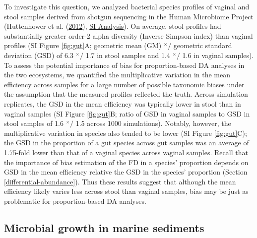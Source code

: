 \documentclass[
]{article}
\newcommand{\md}{^{\times}\!/}
\begin{document}
To investigate this question, we analyzed bacterial species profiles of vaginal and stool samples derived from shotgun sequencing in the Human Microbiome Project
(Huttenhower et al. (\protect\hyperlink{ref-huttenhower2012stru}{2012}), \href{https://mikemc.github.io/differential-abundance-theory/notebook/posts/2022-01-30-hmp-stool-vagina-comparison/}{SI Analysis}).
On average, stool profiles had substantially greater order-2 alpha diversity (Inverse Simpson index) than vaginal profiles (SI Figure \ref{fig:gut}A; geometric mean (GM) \(\md\) geometric standard deviation (GSD) of 6.3 \(\md\) 1.7 in stool samples and 1.4 \(\md\) 1.6 in vaginal samples).
To assess the potential importance of bias for proportion-based DA analyses in the two ecosystems, we quantified the multiplicative variation in the mean efficiency across samples for a large number of possible taxonomic biases under the assumption that the measured profiles reflected the truth.
Across simulation replicates, the GSD in the mean efficiency was typically lower in stool than in vaginal samples (SI Figure \ref{fig:gut}B; ratio of GSD in vaginal samples to GSD in stool samples of 1.6 \(\md\) 1.5 across 1000 simulations).
Notably, however, the multiplicative variation in species also tended to be lower (SI Figure \ref{fig:gut}C); the GSD in the proportion of a gut species across gut samples was an average of 1.75-fold lower than that of a vaginal species across vaginal samples.
Recall that the importance of bias estimation of the FD in a species' proportion depends on GSD in the mean efficiency relative the GSD in the species' proportion (Section \ref{differential-abundance}).
Thus these results suggest that although the mean efficiency likely varies less across stool than vaginal samples, bias may be just as problematic for proportion-based DA analyses.

\hypertarget{microbial-growth-in-marine-sediments}{%
\subsection{Microbial growth in marine sediments}\label{microbial-growth-in-marine-sediments}}
\end{document}
